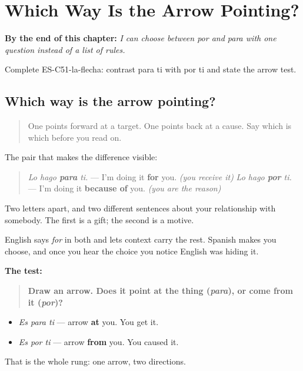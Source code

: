
\chapter{Which Way Is the Arrow Pointing?}
\label{ch:por-para-contrast}

\begin{chapteropening}
\textbf{By the end of this chapter:} \emph{I can choose between por and para with one question instead of a list of rules.}

Complete ES-C51-la-flecha: contrast para ti with por ti and state the arrow test.
\end{chapteropening}

\section[por vs para]{Which way is the arrow pointing?}

\label{lesson:ES-C51-la-flecha}



\begin{quote}
One points forward at a target. One points back at a cause. Say which is which before you read on.
\end{quote}

\begin{grammarlens}[title={Grammar Lens: the same sentence, twice}]
The pair that makes the difference visible:

\begin{quote}
\emph{Lo hago \textbf{para} ti.} — I'm doing it \textbf{for} you. \emph{(you receive it)} \emph{Lo hago \textbf{por} ti.} — I'm doing it \textbf{because of} you. \emph{(you are the reason)}
\end{quote}

Two letters apart, and two different sentences about your relationship with somebody. The first is a gift; the second is a motive.

English says \emph{for} in both and lets context carry the rest. Spanish makes you choose, and once you hear the choice you notice English was hiding it.

\textbf{The test:}

\begin{quote}
\textbf{Draw an arrow. Does it point at the thing (\emph{para}), or come from it (\emph{por})?}
\end{quote}

\begin{itemize}
\raggedright
  \item \emph{Es para ti} — arrow \textbf{at} you. You get it.
  \item \emph{Es por ti} — arrow \textbf{from} you. You caused it.
\end{itemize}

That is the whole rung: one arrow, two directions.
\end{grammarlens}

